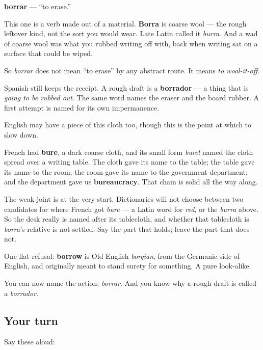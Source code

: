 \begin{cousinweb}
\textbf{borrar} — \textquotedblleft{}to erase.\textquotedblright{}

This one is a verb made out of a material. \textbf{Borra} is coarse wool — the rough leftover kind, not the sort you would wear. Late Latin called it \emph{burra}. And a wad of coarse wool was what you rubbed writing off with, back when writing sat on a surface that could be wiped.

So \emph{borrar} does not mean \textquotedblleft{}to erase\textquotedblright{} by any abstract route. It means \emph{to wool-it-off}.

Spanish still keeps the receipt. A rough draft is a \textbf{borrador} — a thing that is \emph{going to be rubbed out}. The same word names the eraser and the board rubber. A first attempt is named for its own impermanence.

English may have a piece of this cloth too, though this is the point at which to slow down.

French had \textbf{bure}, a dark coarse cloth, and its small form \emph{burel} named the cloth spread over a writing table. The cloth gave its name to the table; the table gave its name to the room; the room gave its name to the government department; and the department gave us \textbf{bureaucracy}. That chain is solid all the way along.

The weak joint is at the very start. Dictionaries will not choose between two candidates for where French got \emph{bure} — a Latin word for \emph{red}, or the \emph{burra} above. So the desk really is named after its tablecloth, and whether that tablecloth is \emph{borra}'s relative is not settled. Say the part that holds; leave the part that does not.

One flat refusal: \textbf{borrow} is Old English \emph{borgian}, from the Germanic side of English, and originally meant to stand surety for something. A pure look-alike.
\end{cousinweb}

\begin{grammarlens}[title={What you've built}]
You can now name the action: \emph{borrar}. And you know why a rough draft is called a \emph{borrador}.
\end{grammarlens}

\subsection*{Your turn}
Say these aloud:

